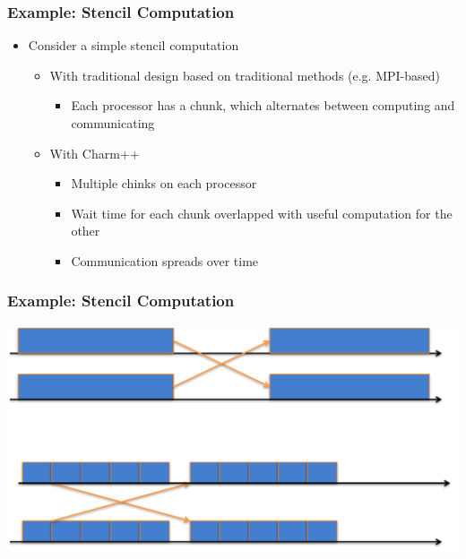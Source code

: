 \begin{frame}[t]
\frametitle{Example: Stencil Computation}
  \begin{itemize}
    \item Consider a simple stencil computation
    \begin{itemize}
      \item With traditional design based on traditional methods (e.g.  MPI-based)
      \begin{itemize}
        \item Each processor has a chunk, which alternates between computing and communicating
      \end{itemize}
      \item With Charm++
      \begin{itemize}
        \item Multiple chinks on each processor
        \item Wait time for each chunk overlapped with useful computation for the other
        \item Communication spreads over time
      \end{itemize}
    \end{itemize}
  \end{itemize}
\end{frame}

\begin{frame}[t]
\frametitle{Example: Stencil Computation}
  \begin{center} \includegraphics[width=\textwidth]{figures/stencil_timeline} \end{center}
\end{frame}

